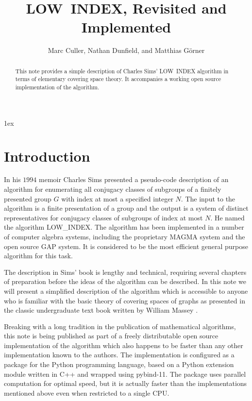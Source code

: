 \documentclass[12pt]{article}
\begin{document}
\normalfont
\title{LOW~INDEX, Revisited and Implemented}
\author{Marc Culler, Nathan Dunfield, and Matthias G\"orner}
\maketitle
\begin{abstract}\noindent
  This note provides a simple description of Charles Sims' LOW~INDEX
  algorithm in terms of elementary covering space theory.  It
  accompanies a working open source implementation of the algorithm.
\end{abstract}
\parindent 0pt 
\parskip 1ex 
\section{Introduction}

In his $1994$ memoir \cite[Chapter 5]{Sims} Charles Sims presented a pseudo-code
description of an algorithm for enumerating all conjugacy classes of subgroups
of a finitely presented group $G$ with index at most a specified integer $N$.
The input to the algorithm is a finite presentation of a group and the output is
a system of distinct representatives for conjugacy classes of subgroups of index
at most $N$.  He named the algorithm LOW\_INDEX.  The algorithm has been
implemented in a number of computer algebra systems, including the proprietary
MAGMA system and the open source GAP system.  It is considered to be the most
efficient general purpose algorithm for this task.

The description in Sims' book is lengthy and technical, requiring several
chapters of preparation before the ideas of the algorithm can be described.  In
this note we will present a simplified description of the algorithm which is
accessible to anyone who is familiar with the basic theory of covering spaces of
graphs as presented in the classic undergraduate text book written by William
Massey \cite{Massey}.

Breaking with a long tradition in the publication of mathematical algorithms,
this note is being published as part of a freely distributable open source
implementation of the algorithm which also happens to be faster than any other
implementation known to the authors.  The implementation is configured as a
package for the Python programming language, based on a Python extension module
written in C++ and wrapped using pybind-11.  The package uses parallel
computation for optimal speed, but it is actually faster than the
implementations mentioned above even when restricted to a single CPU.
\end{document}
